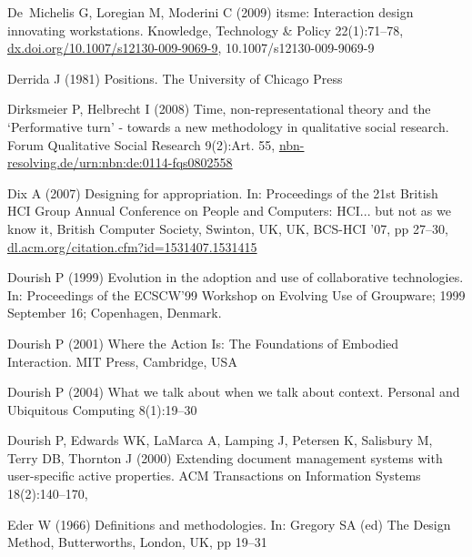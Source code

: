 \documentclass{article}
\begin{document}
\begin{thebibliography}{193}
De~Michelis G, Loregian M, Moderini C (2009) itsme: Interaction design
  innovating workstations. Knowledge, Technology \& Policy 22(1):71--78,
  \urlprefix\url{dx.doi.org/10.1007/s12130-009-9069-9},
  10.1007/s12130-009-9069-9

Derrida J (1981) Positions. The University of Chicago Press

Dirksmeier P, Helbrecht I (2008) Time, non-representational theory and the
  {`Performative} turn' - towards a new methodology in qualitative social
  research. Forum Qualitative Social Research 9(2):Art. 55,
  \urlprefix\url{nbn-resolving.de/urn:nbn:de:0114-fqs0802558}

Dix A (2007) Designing for appropriation. In: Proceedings of the 21st British
  {HCI} Group Annual Conference on People and Computers: {HCI...} but not as we
  know it, British Computer Society, Swinton, {UK}, {UK}, {BCS-HCI} '07, pp
  27--30, \urlprefix\url{dl.acm.org/citation.cfm?id=1531407.1531415}

Dourish P (1999) Evolution in the adoption and use of collaborative
  technologies. In: Proceedings of the {ECSCW'99} Workshop on Evolving Use of
  Groupware; 1999 September 16; Copenhagen, Denmark.

Dourish P (2001) Where the Action Is: The Foundations of Embodied Interaction.
  {MIT} Press, Cambridge, {USA}

Dourish P (2004) What we talk about when we talk about context. Personal and
  Ubiquitous Computing 8(1):19--30

Dourish P, Edwards WK, {LaMarca} A, Lamping J, Petersen K, Salisbury M, Terry
  DB, Thornton J (2000) Extending document management systems with
  user-specific active properties. {ACM} Transactions on Information Systems
  18(2):140--170, 

Eder W (1966) Definitions and methodologies. In: Gregory SA (ed) The Design
  Method, Butterworths, London, {UK}, pp 19--31


\end{thebibliography}
\end{document}
